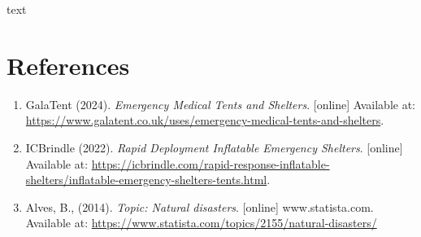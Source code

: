 \documentclass{article}
\begin{document}

\newpage

text

\newpage

\section{References}
\normalsize
\begin{enumerate}
\item GalaTent (2024). \textit{Emergency Medical Tents and Shelters}. [online] Available at: \url{https://www.galatent.co.uk/uses/emergency-medical-tents-and-shelters}.
\item ICBrindle (2022). \textit{Rapid Deployment Inflatable Emergency Shelters}. [online] Available at: \url{https://icbrindle.com/rapid-response-inflatable-shelters/inflatable-emergency-shelters-tents.html}.
\item Alves, B., (2014). \textit{Topic: Natural disasters}. [online] www.statista.com. Available at: \url{https://www.statista.com/topics/2155/natural-disasters/}
\end{enumerate}
	
\end{document}
